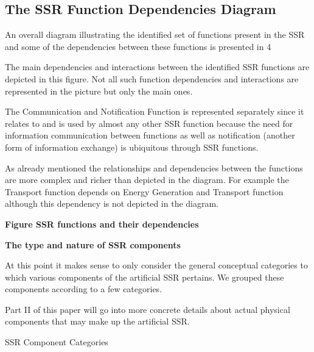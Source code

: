 \documentclass[letterpaper]{article}
\begin{document}
\bigskip

\subsection[The SSR Function Dependencies Diagram]{The SSR Function
Dependencies Diagram}
\hypertarget{RefHeading3106306210128}{}An overall diagram illustrating
the identified set of functions present in the SSR and some of the
dependencies between these functions is presented in 4


\bigskip

The main dependencies and interactions between the identified SSR
functions are depicted in this figure. Not all such function
dependencies and interactions are represented in the picture but only
the main ones. 


\bigskip

The Communication and Notification Function is represented separately
since it relates to and is used by almost any other SSR function
because the need for information communication between functions as
well as notification (another form of information exchange) is
ubiquitous through SSR functions.


\bigskip

As already mentioned the relationships and dependencies between the
functions are more complex and richer than depicted in the diagram. For
example the Transport function depends on Energy Generation and
Transport function although this dependency is not depicted in the
diagram.


\bigskip


\bigskip

{\bfseries
\label{bkm:Ref330735805}Figure  SSR functions and their dependencies}


\bigskip


\bigskip

{\bfseries
\hypertarget{RefHeading3108306210128}{}The type and nature of SSR
components}


\bigskip

At this point it makes sense to only consider the general conceptual
categories to which various components of the artificial SSR pertains.
We grouped these components according to a few categories.

Part II of this paper will go into more concrete details about actual
physical components that may make up the artificial SSR.


\bigskip

SSR Component Categories
\end{document}
